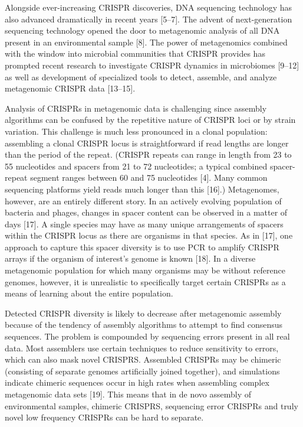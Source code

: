 \documentclass{bmcart}
\begin{document}
Alongside ever-increasing CRISPR discoveries, DNA sequencing technology has also advanced dramatically in recent years [5–7]. The advent of next-generation sequencing technology opened the door to metagenomic analysis of all DNA present in an environmental sample [8]. The power of metagenomics combined with the window into microbial communities that CRISPR provides has prompted recent research to investigate CRISPR dynamics in microbiomes [9–12] as well as development of specialized tools to detect, assemble, and analyze metagenomic CRISPR data [13–15].

Analysis of CRISPRs in metagenomic data is challenging since assembly algorithms can be confused by the repetitive nature of CRISPR loci or by strain variation. This challenge is much less pronounced in a clonal population: assembling a clonal CRISPR locus is straightforward if read lengths are longer than the period of the repeat. (CRISPR repeats can range in length from 23 to 55 nucleotides and spacers from 21 to 72 nucleotides; a typical combined spacer-repeat segment ranges between 60 and 75 nucleotides  [4]. Many common sequencing platforms yield reads much longer than this [16].) Metagenomes, however, are an entirely different story. In an actively evolving population of bacteria and phages, changes in spacer content can be observed in a matter of days [17]. A single species may have as many unique arrangements of spacers within the CRISPR locus as there are organisms in that species. As in [17], one approach to capture this spacer diversity is to use PCR to amplify CRISPR arrays if the organism of interest’s genome is known [18]. In a diverse metagenomic population for which many organisms may be without reference genomes, however, it is unrealistic to specifically target certain CRISPRs as a means of learning about the entire population.

Detected CRISPR diversity is likely to decrease after metagenomic assembly because of the tendency of assembly algorithms to attempt to find consensus sequences. The problem is compounded by sequencing errors present in all real data. Most assemblers use certain techniques to reduce sensitivity to errors, which can also mask novel CRISPRS. Assembled CRISPRs may be chimeric (consisting of separate genomes artificially joined together), and simulations indicate chimeric sequences occur in high rates when assembling complex metagenomic data sets [19]. This means that in de novo assembly of environmental samples, chimeric CRISPRS, sequencing error CRISPRs and truly novel low frequency CRISPRs can be hard to separate.
 
\end{document}
